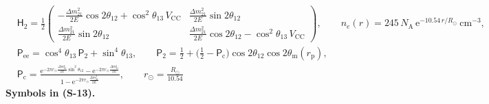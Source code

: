 \documentclass[
  10pt,
]{article}
\begin{document}
\[
\begin{aligned}
&\mathsf{H}_{2} = \frac12\begin{pmatrix}-\frac{\Delta m^2_{21}}{2E}\cos2\theta_{12} + \cos^2\theta_{13}\,V_{\mathrm{CC}} & \frac{\Delta m^2_{21}}{2E}\sin2\theta_{12}\\
 \frac{\Delta m^2_{21}}{2E}\sin2\theta_{12} & \frac{\Delta m^2_{21}}{2E}\cos2\theta_{12} - \cos^2\theta_{13}\,V_{\mathrm{CC}}\end{pmatrix},\qquad
 n_e(r) = 245\,N_{\mathrm{A}}\,\mathrm{e}^{-10.54\,r/R_\odot}\ \text{cm}^{-3},\\
&\mathsf{P}_{\mathrm{ee}} = \cos^4\theta_{13}\,\mathsf{P}_{2} + \sin^4\theta_{13},\qquad
 \mathsf{P}_{2} = \frac12 + \Big(\frac12 - \mathsf{P}_{\mathrm{c}}\Big)\cos2\theta_{12}\cos2\theta_{\mathrm{m}}(r_{\mathrm{p}}),\\
&\mathsf{P}_{\mathrm{c}} = \frac{\mathrm{e}^{-2\pi r_{\odot}\frac{\Delta m^2_{21}}{2E}\sin^2\theta_{12}} - \mathrm{e}^{-2\pi r_{\odot}\frac{\Delta m^2_{21}}{2E}}}
 {1 - \mathrm{e}^{-2\pi r_{\odot}\frac{\Delta m^2_{21}}{2E}}},\qquad r_{\odot} = \frac{R_\odot}{10.54}
\end{aligned} \tag{S-13}
\] \textbf{Symbols in (S-13).}
\end{document}
